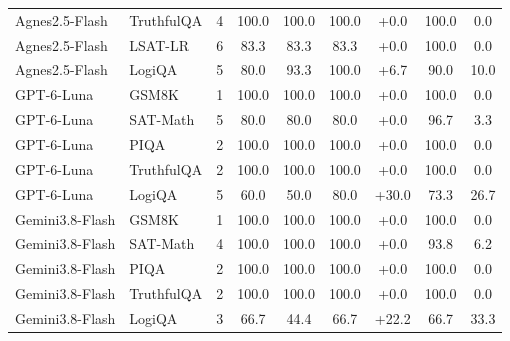 \begin{tabular*}{\columnwidth}{@{\extracolsep{\fill}} l l c c c c c c c}
Agnes2.5-Flash & TruthfulQA & 4 & 100.0 & 100.0 & 100.0 & +0.0 & 100.0 & 0.0 \\
Agnes2.5-Flash & LSAT-LR & 6 & 83.3 & 83.3 & 83.3 & +0.0 & 100.0 & 0.0 \\
Agnes2.5-Flash & LogiQA & 5 & 80.0 & 93.3 & 100.0 & +6.7 & 90.0 & 10.0 \\
\midrule
GPT-6-Luna & GSM8K & 1 & 100.0 & 100.0 & 100.0 & +0.0 & 100.0 & 0.0 \\
GPT-6-Luna & SAT-Math & 5 & 80.0 & 80.0 & 80.0 & +0.0 & 96.7 & 3.3 \\
GPT-6-Luna & PIQA & 2 & 100.0 & 100.0 & 100.0 & +0.0 & 100.0 & 0.0 \\
GPT-6-Luna & TruthfulQA & 2 & 100.0 & 100.0 & 100.0 & +0.0 & 100.0 & 0.0 \\
GPT-6-Luna & LogiQA & 5 & 60.0 & 50.0 & 80.0 & +30.0 & 73.3 & 26.7 \\
\midrule
Gemini3.8-Flash & GSM8K & 1 & 100.0 & 100.0 & 100.0 & +0.0 & 100.0 & 0.0 \\
Gemini3.8-Flash & SAT-Math & 4 & 100.0 & 100.0 & 100.0 & +0.0 & 93.8 & 6.2 \\
Gemini3.8-Flash & PIQA & 2 & 100.0 & 100.0 & 100.0 & +0.0 & 100.0 & 0.0 \\
Gemini3.8-Flash & TruthfulQA & 2 & 100.0 & 100.0 & 100.0 & +0.0 & 100.0 & 0.0 \\
Gemini3.8-Flash & LogiQA & 3 & 66.7 & 44.4 & 66.7 & +22.2 & 66.7 & 33.3 \\
\bottomrule
\end{tabular*}